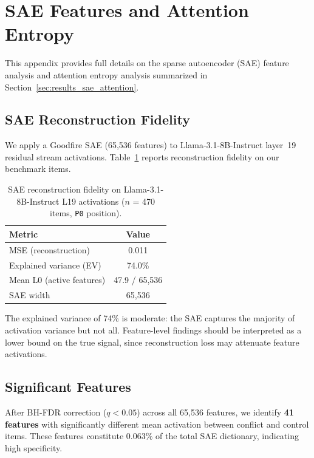\documentclass{article}
\newcommand{\pzero}{\texttt{P0}}
\begin{document}
\section{SAE Features and Attention Entropy}
\label{app:sae_attention}

This appendix provides full details on the sparse autoencoder (SAE)
feature analysis and attention entropy analysis summarized in
Section~\ref{sec:results_sae_attention}.

\subsection{SAE Reconstruction Fidelity}

We apply a Goodfire SAE (65{,}536 features) to
Llama-3.1-8B-Instruct layer~19 residual stream activations.
Table~\ref{tab:app_sae_fidelity} reports reconstruction fidelity
on our benchmark items.

\begin{table}[ht]
\centering
\caption{SAE reconstruction fidelity on Llama-3.1-8B-Instruct L19
  activations ($n$ = 470 items, \pzero{} position).}
\label{tab:app_sae_fidelity}
\vspace{4pt}
\small
\begin{tabular}{lc}
\toprule
\textbf{Metric} & \textbf{Value} \\
\midrule
MSE (reconstruction)         & 0.011 \\
Explained variance (EV)      & 74.0\% \\
Mean L0 (active features)    & 47.9 / 65{,}536 \\
SAE width                    & 65{,}536 \\
\bottomrule
\end{tabular}
\end{table}

\noindent The explained variance of 74\% is moderate: the SAE
captures the majority of activation variance but not all.
Feature-level findings should be interpreted as a lower bound on the
true signal, since reconstruction loss may attenuate feature
activations.

\subsection{Significant Features}

After BH-FDR correction ($q < 0.05$) across all 65{,}536 features,
we identify \textbf{41 features} with significantly different mean
activation between conflict and control items.  These features
constitute 0.063\% of the total SAE dictionary, indicating high
specificity.
\end{document}
